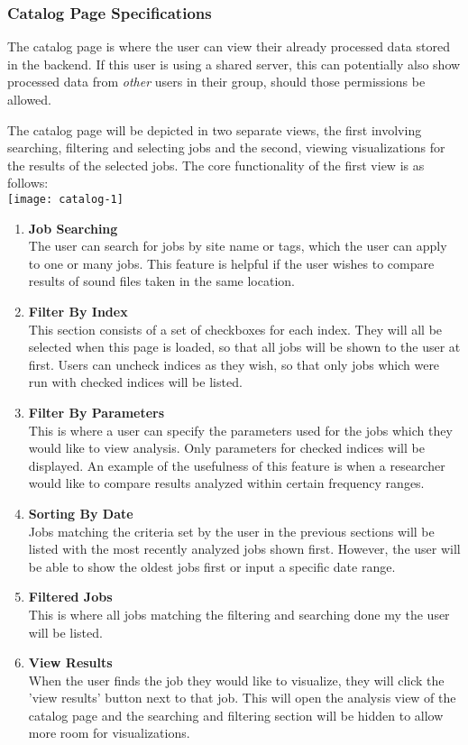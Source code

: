 \subsubsection{Catalog Page Specifications}
The catalog page is where the user can view their already processed data stored in the backend. If this user is using a shared server, this can potentially also show processed data from \textit{other} users in their group, should those permissions be allowed.\par
The catalog page will be depicted in two separate views, the first involving searching, filtering and selecting jobs and the second, viewing visualizations for the results of the selected jobs. The core functionality of the first view is as follows:\\
\texttt{[image: catalog-1]}
\begin{enumerate}
    \item \textbf{Job Searching}\\ The user can search for jobs by site name or tags, which the user can apply to one or many jobs. This feature is helpful if the user wishes to compare results of sound files taken in the same location.
    \item \textbf{Filter By Index}\\ This section consists of a set of checkboxes for each index. They will all be selected when this page is loaded, so that all jobs will be shown to the user at first. Users can uncheck indices as they wish, so that only jobs which were run with checked indices will be listed.
    \item \textbf{Filter By Parameters}\\ This is where a user can specify the parameters used for the jobs which they would like to view analysis. Only parameters for checked indices will be displayed. An example of the usefulness of this feature is when a researcher would like to compare results analyzed within certain frequency ranges.
    \item \textbf{Sorting By Date}\\ Jobs matching the criteria set by the user in the previous sections will be listed with the most recently analyzed jobs shown first. However, the user will be able to show the oldest jobs first or input a specific date range.
    \item \textbf{Filtered Jobs}\\ This is where all jobs matching the filtering and searching done my the user will be listed.
    \item \textbf{View Results}\\ When the user finds the job they would like to visualize, they will click the 'view results' button next to that job. This will open the analysis view of the catalog page and the searching and filtering section will be hidden to allow more room for visualizations.
\end{enumerate}
